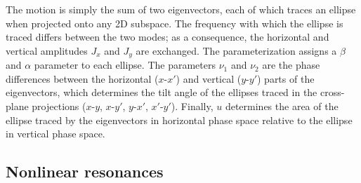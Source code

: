 %
The motion is simply the sum of two eigenvectors, each of which traces an ellipse when projected onto any 2D subspace. The frequency with which the ellipse is traced differs between the two modes; as a consequence, the horizontal and vertical amplitudes $J_x$ and $J_y$ are exchanged. The parameterization assigns a $\beta$ and $\alpha$ parameter to each ellipse. The parameters $\nu_1$ and $\nu_2$ are the phase differences between the horizontal ($x$-$x'$) and vertical ($y$-$y'$) parts of the eigenvectors, which determines the tilt angle of the ellipses traced in the cross-plane projections ($x$-$y$, $x$-$y'$, $y$-$x'$, $x'$-$y'$). Finally, $u$ determines the area of the ellipse traced by the eigenvectors in horizontal phase space relative to the ellipse in vertical phase space. 


\subsection{Nonlinear resonances}

